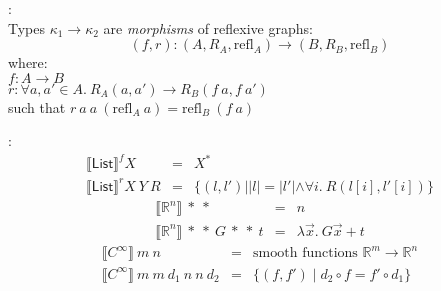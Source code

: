 \documentclass[xetex,serif,mathserif]{beamer}
\newenvironment{slide}[1]{\begin{frame}\frametitle{#1}}{\end{frame}}
\newcommand{\sepbar}{\mathrel|}
\begin{document}
\begin{slide}{}
  : \\
  \quad Types $\kappa_1 \to \kappa_2$ are \emph{morphisms} of reflexive graphs:
  \begin{displaymath}
    (f,r) : (A, R_A, \mathrm{refl}_A) \to (B, R_B, \mathrm{refl}_B)
  \end{displaymath}
  \quad where: \\
  \quad\quad $f : A \to B$ \\
  \quad\quad $r : \forall a,a' \in A.~R_A(a,a') \to R_B(f~a, f~a')$ \\
  \quad\quad\quad such that $r~a~a~(\mathrm{refl}_A~a) = \mathrm{refl}_B~(f~a)$

  \pause
  \bigskip

  : \\
  \begin{displaymath}
    \begin{array}{lcl}
      \llbracket \mathsf{List} \rrbracket^f X &=& X^* \\
      \llbracket \mathsf{List} \rrbracket^r X~Y~R &=& \{ (l, l') \sepbar |l| = |l'| \land \forall i.~R(l[i], l'[i]) \}
    \end{array}
  \end{displaymath}
  \begin{displaymath}
    \begin{array}{lcl}
      \llbracket \mathbb{R}^n \rrbracket~*~* &=& n \\
      \llbracket \mathbb{R}^n \rrbracket~*~*~G~*~*~t &=& \lambda \vec{x}.~G\vec{x} + t
    \end{array}
  \end{displaymath}
  \begin{displaymath}
    \begin{array}{lcl}
      \llbracket C^\infty \rrbracket~m~n & = & \textrm{smooth functions }\mathbb{R}^m \to \mathbb{R}^n \\
      \llbracket C^\infty \rrbracket~m~m~d_1~n~n~d_2 & = & \{ (f,f') \sepbar d_2 \circ f = f' \circ d_1 \}
    \end{array}
  \end{displaymath}
\end{slide}

\newcommand{\elab}[1]{\lfloor #1 \rfloor}
\end{document}
